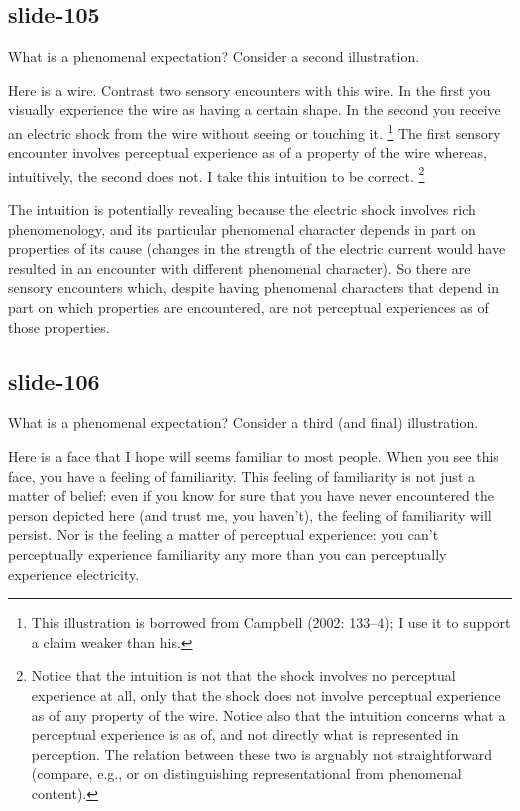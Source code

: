 \documentclass[12pt,\papersize]{extarticle}
\begin{document}
\subsection{slide-105}
What is a phenomenal expectation?  Consider a second illustration.

Here is a wire.
Contrast two sensory encounters with this wire. In the first you visually
experience the wire as having a certain shape. In the second you receive an
electric shock from the wire without seeing or touching it.%
\footnote{This illustration is borrowed from Campbell (2002: 133–4); I use it to support a claim weaker than his.}
The first sensory encounter involves perceptual experience as of a property of
the wire whereas, intuitively, the second does not.
I take this intuition to be correct.%
\footnote{
Notice that the intuition is not that the shock involves no
perceptual experience at all, only that the shock does not involve
perceptual experience as of any property of the wire. Notice also that the
intuition concerns what a perceptual experience is as of, and not directly
what is represented in perception. The relation between these two is
arguably not straightforward (compare, e.g., \citet[p.~28]{Shoemaker:1994el} or
\citet[pp.~50--2]{Chalmers:2006xq} on distinguishing representational from
phenomenal content).
}

The intuition is potentially revealing because the electric shock involves
rich phenomenology, and its particular phenomenal character depends in part
on properties of its cause (changes in the strength of the electric current
would have resulted in an encounter with different phenomenal character).
So there are sensory encounters which, despite having phenomenal characters
that depend in part on which properties are encountered, are not perceptual
experiences as of those properties.

\subsection{slide-106}
What is a phenomenal expectation?  Consider a third (and final) illustration.

Here is a face that I hope will seems familiar to most people.
When you see this face, you have a feeling of familiarity.
This feeling of familiarity is not just a matter of belief:
even if you know for sure that you have never encountered the person
depicted here (and trust me, you haven’t), the feeling of familiarity
will persist.
Nor is the feeling a matter of perceptual experience: you can’t
perceptually experience familiarity
any more than you can perceptually experience electricity.
\end{document}
